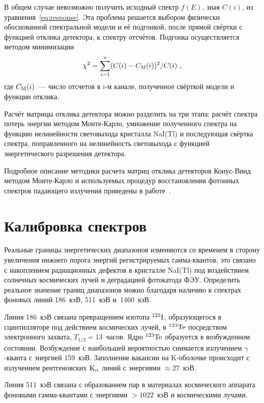 В общем случае невозможно получить исходный спектр $f(E)$, зная $C(i)$, из 
уравнения~\ref{eq:response}.  Эта проблема решается выбором физически обоснованной 
спектральной модели и её подгонкой, после прямой свёртки с функцией отклика детектора, 
к спектру отсчётов. Подгонка осуществляется методом минимизации
\begin{equation}\label{eq:chisq}
    \chi^2=\sum\limits_{i=1}^n(C(i)-C_{\mathrm{M}}(i))^2/C(i) \mbox{ ,}
\end{equation}
где $C_{\mathrm{M}}(i)$~--- число отсчетов в i-м канале, полученное свёрткой модели и функции отклика.

Расчёт матрицы отклика детектора можно разделить на три этапа: расчёт спектра 
потерь энергии методом Монте-Карло, умножение полученного спектра на функцию 
нелинейности световыхода кристалла NaI(Tl) и последующая свёртка спектра, 
поправленного на нелинейность световыхода с функцией энергетического разрешения 
детектора.

Подробное описание методики расчета матриц отклика детекторов Конус-Винд методом Монте-Карло 
и используемых процедур восстановления фотонных спектров падающего излучения 
приведены в работе~\citep{Terekhov_1998AIPC}.

\section{Калибровка спектров}
Реальные границы энергетических диапазонов изменяются со временем в сторону 
увеличения нижнего порога энергий регистрируемых гамма-квантов, это  
связано с накоплением радиационных дефектов в кристалле NaI(Tl) под воздействием 
солнечных космических лучей и деградацией фотокатода ФЭУ. Определить реальное значение 
границ диапазонов можно благодаря наличию в спектрах фоновых линий 186~кэВ, 511~кэВ и~1460~кэВ.

Линия 186~кэВ связана превращением изотопа $^{123}{\mathrm{I}}$, образующегося в 
сцинтилляторе под действием космических лучей, в $^{123}{\mathrm{Te}}$ посредством 
электронного захвата, $T_{1/2}=13$~часов. Ядро $^{123}{\mathrm{Te}}$ образуется в 
возбужденном состоянии. Возбуждение с наибольшей вероятностью снимается излучением $\gamma$-кванта 
с энергией 159~кэВ. Заполнение вакансии на K-оболочке происходит с излучением 
рентгеновских ${\mathrm{K}}_{\alpha}$ линий с энергиями $\approx 27$~кэВ.

Линия 511~кэВ связана с образованием пар в материалах космического аппарата 
фоновыми гамма-квантами с энергиями $>1022$~кэВ и космическими лучами.

